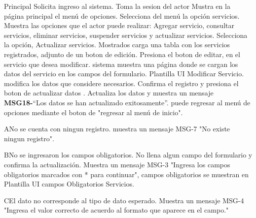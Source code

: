 	\begin{UCtrayectoria}{Principal}
		\UCpaso Solicita ingreso al sistema.
		\UCpaso Toma la sesion del actor
		\UCpaso Mustra en la página principal el menú de opciones.
		\UCpaso[\UCactor] Selecciona del menú la opción servicios.
		\UCpaso Muestra las opciones que el actor puede realizar: Agregar servicio, consultar servicios, eliminar servicios, suspender servicios y actualizar servicios.
		\UCpaso[\UCactor] Selecciona la opción, Actualizar servicios. Mostrados 
		\UCpaso carga una tabla con los servicios registrados, adjunto de un boton de edición.
		\UCpaso[\UCactor] Presiona el boton de editar, en el servicio que desea modificar.
		\UCpaso sistema muestra una página donde se cargan los datos del servicio en los campos del formulario. Plantilla UI Modificar Servicio.
		\UCpaso[\UCactor] modifica los datos que considere necesarios.
		\UCpaso[\UCactor] Confirma el registro y presiona el boton de actualizar datos   .
		\UCpaso Actualiza los datos y muestra un mensaje {\bf MSG18-}``Los datos se han actualizado exitosamente''.
		\UCpaso[\UCactor] puede regresar al menú de opciones mediante el boton de "regresar al menú de inicio".
	\end{UCtrayectoria}

		\begin{UCtrayectoriaA}{A}{No se cuenta con ningun registro.}
		\UCpaso muestra un mensaje MSG-7 "No existe ningun registro".
		\end{UCtrayectoriaA}

		\begin{UCtrayectoriaA}{B}{No se ingresaron los campos obligatorios.}
			\UCpaso[\UCactor] No llena algun campo del formulario y confirma la actualización.
			\UCpaso Muestra un mensaje MSG-3 "Ingresa los campos obligatorios marcados con * para continuar", campos obligatorios se muestran en Plantilla UI campos Obligatorios Servicios.
		\end{UCtrayectoriaA}

		\begin{UCtrayectoriaA}{C}{El dato no corresponde al tipo de dato esperado.}
			\UCpaso Muestra un mensaje MSG-4 "Ingresa el valor correcto de acuerdo al formato que aparece en el campo."
		\end{UCtrayectoriaA}
	
